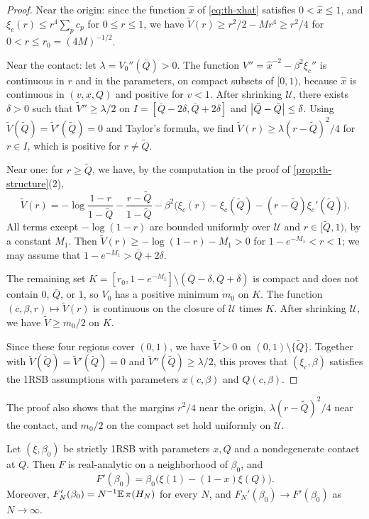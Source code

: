 \begin{proof}
Near the origin: since the function $\hat x$ of \eqref{eq:th-xhat} satisfies $0<\hat x\le1$, and $\xi_c(r)\le r^4\sum_pc_p$ for $0\le r\le1$, we have $\tilde V(r)\ge r^2/2-Mr^4\ge r^2/4$ for $0<r\le r_0=(4M)^{-1/2}$.

Near the contact: let $\lambda=V_0''(\bar Q)>0$. The function $V''=\hat x^{-2}-\beta^2\xi_c''$ is continuous in $r$ and in the parameters, on compact subsets of $[0,1)$, because $\hat x$ is continuous in $(v,x,Q)$ and positive for $v<1$. After shrinking $\mathcal U$, there exists $\delta>0$ such that $\tilde V''\ge\lambda/2$ on $I=[\bar Q-2\delta,\bar Q+2\delta]$ and $\left|\tilde Q-\bar Q\right|\le\delta$. Using $\tilde V(\tilde Q)=\tilde V'(\tilde Q)=0$ and Taylor's formula, we find $\tilde V(r)\ge\lambda(r-\tilde Q)^2/4$ for $r\in I$, which is positive for $r\ne\tilde Q$.

Near one: for $r\ge\tilde Q$, we have, by the computation in the proof of \cref{prop:th-structure}(2),
\[
\tilde V(r)=-\log\frac{1-r}{1-\tilde Q}-\frac{r-\tilde Q}{1-\tilde Q}-\beta^2\big(\xi_c(r)-\xi_c(\tilde Q)-(r-\tilde Q)\xi_c'(\tilde Q)\big).
\]
All terms except $-\log(1-r)$ are bounded uniformly over $\mathcal U$ and $r\in[\tilde Q,1)$, by a constant $M_1$. Then $\tilde V(r)\ge-\log(1-r)-M_1>0$ for $1-e^{-M_1}<r<1$; we may assume that $1-e^{-M_1}>\bar Q+2\delta$.

The remaining set $K=[r_0,1-e^{-M_1}]\setminus(\bar Q-\delta,\bar Q+\delta)$ is compact and does not contain $0$, $\bar Q$, or $1$, so $V_0$ has a positive minimum $m_0$ on $K$. The function $(c,\beta,r)\mapsto\tilde V(r)$ is continuous on the closure of $\mathcal U$ times $K$. After shrinking $\mathcal U$, we have $\tilde V\ge m_0/2$ on $K$.

Since these four regions cover $(0,1)$, we have $\tilde V>0$ on $(0,1)\setminus\{\tilde Q\}$. Together with $\tilde V(\tilde Q)=\tilde V'(\tilde Q)=0$ and $\tilde V''(\tilde Q)\ge\lambda/2$, this proves that $(\xi_c,\beta)$ satisfies the 1RSB assumptions with parameters $x(c,\beta)$ and $Q(c,\beta)$.
\end{proof}

The proof also shows that the margins $r^2/4$ near the origin, $\lambda(r-\tilde Q)^2/4$ near the contact, and $m_0/2$ on the compact set hold uniformly on $\mathcal U$.

\begin{corollary}\label{cor:th-pressure}
Let $(\xi,\beta_0)$ be strictly 1RSB with parameters $x,Q$ and a nondegenerate contact at $Q$. Then $F$ is real-analytic on a neighborhood of $\beta_0$, and
\begin{equation}\label{eq:th-Fprime}
F'(\beta_0)=\beta_0\big(\xi(1)-(1-x)\xi(Q)\big).
\end{equation}
Moreover, $F_N'(\beta_0)=N^{-1}\mathbb E\,\pi(H_N)$ for every $N$, and $F_N'(\beta_0)\to F'(\beta_0)$ as $N\to\infty$.
\end{corollary}

